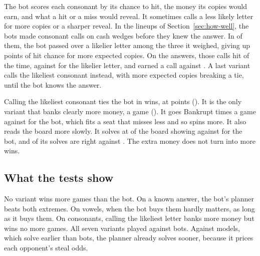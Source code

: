 The bot scores each consonant by its chance to hit, the money its copies would earn, and what a hit or a miss would reveal. It sometimes calls a less likely letter for more copies or a sharper reveal. In the lineups of Section~\ref{sec:how-well}, the bots made \LetterTradeCalls{} consonant calls on cash wedges before they knew the answer. In \LetterTradeShare{} of them, the bot passed over a likelier letter among the three it weighed, giving up \LetterTradeGaveUp{} points of hit chance for \LetterTradeCopies{} more expected copies. On the answers, those calls hit \LetterTradeHitChosen{} of the time, against \LetterTradeHitLikelier{} for the likelier letter, and earned \LetterTradeMoneyChosen{} a call against \LetterTradeMoneyLikelier. A last variant calls the likeliest consonant instead, with more expected copies breaking a tie, until the bot knows the answer.

Calling the likeliest consonant ties the bot in wins, at \VariantHitFirstVsBoth{} points (\VariantHitFirstVsBothCI). It is the only variant that banks clearly more money, \VariantHitFirstMainVsBoth{} a game (\VariantHitFirstMainVsBothCI). It goes Bankrupt \VariantHitFirstBankrupts{} times a game against \VariantHitFirstBaseBankrupts{} for the bot, which fits a seat that misses less and so spins more. It also reads the board more slowly. It solves at \VariantHitFirstShown{} of the board showing against \VariantHitFirstBaseShown{} for the bot, and \VariantHitFirstAcc{} of its solves are right against \VariantHitFirstBaseAcc. The extra money does not turn into more wins.

\subsection{What the tests show}

No variant wins more games than the bot. On a known answer, the bot's planner beats both extremes. On vowels, when the bot buys them hardly matters, as long as it buys them. On consonants, calling the likeliest letter banks more money but wins no more games. All seven variants played against bots. Against models, which solve earlier than bots, the planner already solves sooner, because it prices each opponent's steal odds.
